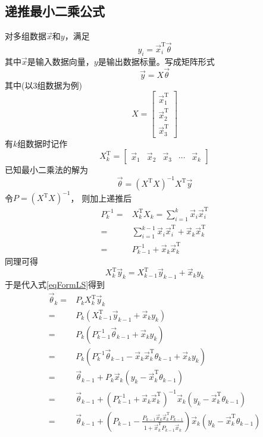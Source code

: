 \subsection{递推最小二乘公式}
对多组数据$\vec{x}$和$y$，满足
\[y_i = \vec{x}^\mathrm{T}_i\vec{\theta}\]
其中$\vec{x}$是输入数据向量，$y$是输出数据标量。写成矩阵形式
\[\vec{y} = X\vec{\theta}\]
其中(以3组数据为例)
\begin{equation*}
    X = \left[\begin{matrix}
        \vec{x}^\mathrm{T}_1 \\
        \vec{x}^\mathrm{T}_2 \\
        \vec{x}^\mathrm{T}_3
    \end{matrix}\right]
\end{equation*}
有$k$组数据时记作
\begin{equation*}
    X^\mathrm{T}_k = \left[\begin{matrix}
        \vec{x}_1 & \vec{x}_2 & \vec{x}_3 &
        \cdots & \vec{x}_k
    \end{matrix}\right]
\end{equation*}
已知最小二乘法的解为
\begin{equation*}
    \vec{\theta}
    =(X^\mathrm{T}X)^{-1}
    X^\mathrm{T}\vec{y} \label{eqFormLS}
\end{equation*}
令$P = (X^\mathrm{T}X)^{-1}$，
则加上递推后
\begin{align*}
    P_k^{-1} =& X_k^\mathrm{T}X_k
    = \sum_{i=1}^k\vec{x}_i\vec{x}^\mathrm{T}_i \\
    =& \sum_{i=1}^{k-1}\vec{x}_i\vec{x}^\mathrm{T}_i
    +\vec{x}_k\vec{x}^\mathrm{T}_k \\
    =& P_{k-1}^{-1} + \vec{x}_k\vec{x}_k^\mathrm{T}
\end{align*}
同理可得
\begin{equation*}
    X_k^\mathrm{T}\vec{y}_k
    =X_{k-1}^\mathrm{T}\vec{y}_{k-1}
    +\vec{x}_ky_k
\end{equation*}
于是代入式\eqref{eqFormLS}得到
\begin{align*}
    \vec{\theta}_k =& P_kX_k^\mathrm{T}\vec{y}_k \\
    =& P_k(X_{k-1}^\mathrm{T}\vec{y}_{k-1}
    +\vec{x}_ky_k) \\
    =& P_k(P_{k-1}^{-1}\vec{\theta}_{k-1}
    +\vec{x}_ky_k) \\
    =& P_k(P_k^{-1}\vec{\theta}_{k-1}
    -\vec{x}_k\vec{x}_k^\mathrm{T}\theta_{k-1}+\vec{x}_ky_k) \\
    =& \vec{\theta}_{k-1} + P_k\vec{x}_k
    (y_k-\vec{x}_k^\mathrm{T}\theta_{k-1}) \\
    =& \vec{\theta}_{k-1}
    +(P_{k-1}^{-1} + \vec{x}_k\vec{x}_k^\mathrm{T})^{-1}
    \vec{x}_k(y_k-\vec{x}_k^\mathrm{T}\theta_{k-1}) \\
    =& \vec{\theta}_{k-1}
    +(P_{k-1}-\frac{P_{k-1}\vec{x}_k\vec{x}_k^\mathrm{T}
    P_{k-1}}{1+\vec{x}_k^\mathrm{T}P_{k-1}\vec{x}_k})
    \vec{x}_k(y_k-\vec{x}_k^\mathrm{T}\theta_{k-1}) \\
\end{align*}
